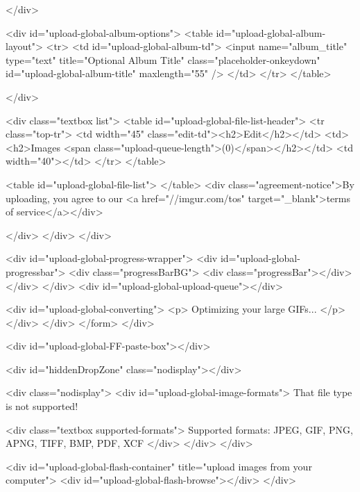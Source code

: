                 </div>

                <div id="upload-global-album-options">
                    <table id="upload-global-album-layout">
    <tr>
        <td id="upload-global-album-td">
            <input name="album_title" type="text" title="Optional Album Title" class="placeholder-onkeydown" id="upload-global-album-title" maxlength="55" />
        </td>
    </tr>
</table>

                </div>

                <div class="textbox list">
                    <table id="upload-global-file-list-header">
                        <tr class="top-tr">
                            <td width="45" class="edit-td"><h2>Edit</h2></td>
                            <td><h2>Images <span class="upload-queue-length">(0)</span></h2></td>
                            <td width="40"></td>
                        </tr>
                    </table>

                    <table id="upload-global-file-list">
                    </table>
                                            <div class="agreement-notice">By uploading, you agree to our <a href="//imgur.com/tos" target="_blank">terms of service</a></div>
                    
                </div>
            </div>
        </div>

        <div id="upload-global-progress-wrapper">
            <div id="upload-global-progressbar">
                <div class="progressBarBG">
                    <div class="progressBar"></div>
                </div>
            </div>
            <div id="upload-global-upload-queue"></div>

            <div id="upload-global-converting">
                <p>
                    Optimizing your large GIFs...
                </p>
            </div>
        </div>
    </form>
</div>

<div id="upload-global-FF-paste-box"></div>

<div id="hiddenDropZone" class="nodisplay"></div>

<div class="nodisplay">
    <div id="upload-global-image-formats">
         That file type is not supported!

        <div class="textbox supported-formats">
            Supported formats: JPEG, GIF, PNG, APNG, TIFF, BMP, PDF, XCF
        </div>
    </div>
</div>

<div id="upload-global-flash-container" title="upload images from your computer">
    <div id="upload-global-flash-browse"></div>
</div>

